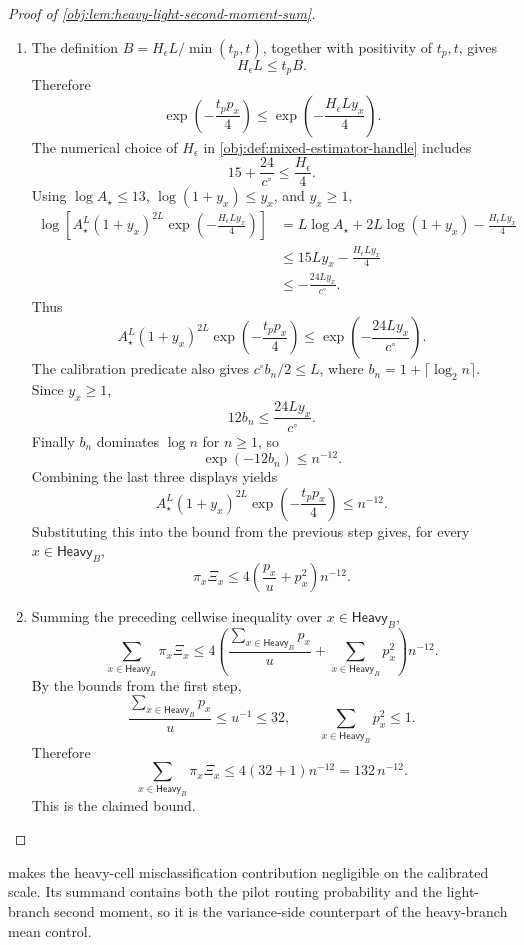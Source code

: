 \documentclass[11pt]{article}
\begin{document}
\begin{proof}[Proof of \cref{obj:lem:heavy-light-second-moment-sum}]
\begin{enumerate}
\item The definition \(B=H_\epsilon L/\min(t_p,t)\), together with positivity of \(t_p,t\), gives
\[
H_\epsilon L\le t_pB.
\]
Therefore
\[
\exp\!\left(-\frac{t_pp_x}{4}\right)
\le
\exp\!\left(-\frac{H_\epsilon L y_x}{4}\right).
\]
The numerical choice of \(H_\epsilon\) in \cref{obj:def:mixed-estimator-handle} includes
\[
15+\frac{24}{c^\circ}\le \frac{H_\epsilon}{4}.
\]
Using \(\log A_\star\le13\), \(\log(1+y_x)\le y_x\), and \(y_x\ge1\),
\[
\begin{aligned}
\log\!\left[
A_\star^L(1+y_x)^{2L}
\exp\!\left(-\frac{H_\epsilon L y_x}{4}\right)
\right]
&=
L\log A_\star+2L\log(1+y_x)-\frac{H_\epsilon L y_x}{4} \\
&\le
15Ly_x-\frac{H_\epsilon L y_x}{4} \\
&\le
-\frac{24Ly_x}{c^\circ}.
\end{aligned}
\]
Thus
\[
A_\star^L(1+y_x)^{2L}
\exp\!\left(-\frac{t_pp_x}{4}\right)
\le
\exp\!\left(-\frac{24Ly_x}{c^\circ}\right).
\]
The calibration predicate also gives \(c^\circ b_n/2\le L\), where \(b_n=1+\lceil\log_2 n\rceil\). Since \(y_x\ge1\),
\[
12b_n\le \frac{24Ly_x}{c^\circ}.
\]
Finally \(b_n\) dominates \(\log n\) for \(n\ge1\), so
\[
\exp(-12b_n)\le n^{-12}.
\]
Combining the last three displays yields
\[
A_\star^L(1+y_x)^{2L}
\exp\!\left(-\frac{t_pp_x}{4}\right)
\le n^{-12}.
\]
Substituting this into the bound from the previous step gives, for every \(x\in\mathsf{Heavy}_B\),
\[
\pi_x\Xi_x
\le
4\left(\frac{p_x}{u}+p_x^2\right)n^{-12}.
\] %

\item Summing the preceding cellwise inequality over \(x\in\mathsf{Heavy}_B\),
\[
\sum_{x\in\mathsf{Heavy}_B}\pi_x\Xi_x
\le
4\left(
\frac{\sum_{x\in\mathsf{Heavy}_B}p_x}{u}
+
\sum_{x\in\mathsf{Heavy}_B}p_x^2
\right)n^{-12}.
\]
By the bounds from the first step,
\[
\frac{\sum_{x\in\mathsf{Heavy}_B}p_x}{u}
\le
u^{-1}
\le32,
\qquad
\sum_{x\in\mathsf{Heavy}_B}p_x^2\le1.
\]
Therefore
\[
\sum_{x\in\mathsf{Heavy}_B}\pi_x\Xi_x
\le
4(32+1)n^{-12}
=
132\,n^{-12}.
\]
This is the claimed bound. %
\end{enumerate}
\end{proof}

 makes the heavy-cell misclassification contribution negligible on the calibrated scale. Its summand contains both the pilot routing probability and the light-branch second moment, so it is the variance-side counterpart of the heavy-branch mean control.
\end{document}
